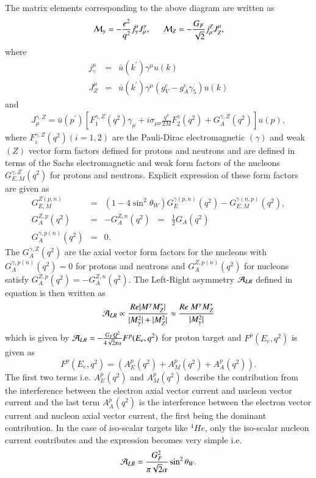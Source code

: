 The matrix elements corresponding to the above diagram are  written as 
\begin{eqnarray}
{\cal M}_\gamma= -\frac{e^2}{q^2}j^\mu_\gamma J_\mu^\gamma, ~~~~~~ {\cal M}_{Z}= -\frac{G_F}{\sqrt{2}}j_\mu^Z J^\mu_Z, \label{chap9-eq17}
\end{eqnarray}
where
\begin{eqnarray}
j^\mu_\gamma&=& \bar{u}(k^\prime)\gamma^\mu u(k) \label{chap9-eq18}\\
J^\mu_Z &=& \bar{u}(k^\prime)\gamma^\mu (g_V^e-g_A^e\gamma_5)u(k) \label{chap9-eq19}
\end{eqnarray}
and 
\begin{eqnarray}
J^{\gamma,Z}_\mu = \bar{u}(p^\prime)[F_1^{\gamma,Z}(q^2)\gamma_\mu+i\sigma_{\mu\nu}\frac{q^\nu}{2M}F_2^\gamma(q^2)+G_A^{\gamma,Z}(q^2)]u(p), \label{chap9-eq20}
\end{eqnarray}
where $F_i^{\gamma,Z}(q^2)(i=1,2)$ are the Pauli-Dirac electromagnetic $(\gamma)$ and weak $(Z)$ vector form factors defined for protons and neutrons and are defined in terms of the Sachs electromagnetic and weak form factors of the nucleons $G^{\gamma,Z}_{E,M}(q^2)$ for protons and neutrons. Explicit expression of these form factors are given as
\begin{eqnarray}
 G_{E,M}^{Z(p,n)}&=&(1-4\sin^2 \theta_W)G_{E}^{\gamma(p,n)}(q^2)-G_{E,M}^{\gamma(n,p)} (q^2), \label{chap9-eq21}\\
 G_A^{Z,p}(q^2)&=&-G_A^{Z,n}(q^2) \;\; = \;\; \frac{1}{2}G_A(q^2) \label{chap9-eq22}\\ 
 G_A^{\gamma,p(n)}(q^2)&=& 0 .  \label{chap9-eq23}
\end{eqnarray}
The $G^{\gamma,Z}_A(q^2)$ are the axial vector form factors for the nucleons with $G^{\gamma,p(n)}_A(q^2)=0$ for protons and neutrons and $G_{A}^{{Z,p(n)}}(q^2)$ for nucleons satisfy $G^{Z,p}_A(q^2)=-G^{Z,n}_A(q^2)$. The Left-Right asymmetry ${\cal A}_{LR}$ defined in equation is then written as 
\begin{equation}
 {\cal A}_{LR}\propto \frac{Re|M^\gamma M_Z^*|}{|M_\gamma^2|+|M_Z^2|} \approx \frac{Re~ M^\gamma M_Z^*}{|M_\gamma^2|} \label{chap9-eq24}
\end{equation}
 which is given by ${\cal A}_{LR}=-\frac{G_F Q^2}{4\sqrt{2}\pi\alpha}F^p(E_e,q^2)$ for proton target and $F^p(E_e,q^2)$ is given as\cite{key16}
 \begin{equation}
F^p(E_e,q^2)= (A^{p}_E(q^2) +A_M^{p}(q^2)+A_A^p(q^2)). \label{chap9-eq25}
 \end{equation}
The first two terms i.e. $A^{p}_E(q^2)$ and $A_M^{p}(q^2)$ describe the contribution from the interference between the electron axial vector current and nucleon vector current and the last term $A_A^p(q^2)$ is the interference between the electron vector current and nucleon axial vector current, the first being the dominant contribution. In the case of  iso-scalar targets like $^4{He}$, only the iso-scalar nucleon current contributes and the expression becomes very simple i.e. 
\begin{equation}
 {\cal A}_{LR} = \frac{G_F^2}{\pi\sqrt{2}\alpha}\sin^2\theta_W. \label{chap9-eq26}
\end{equation}

